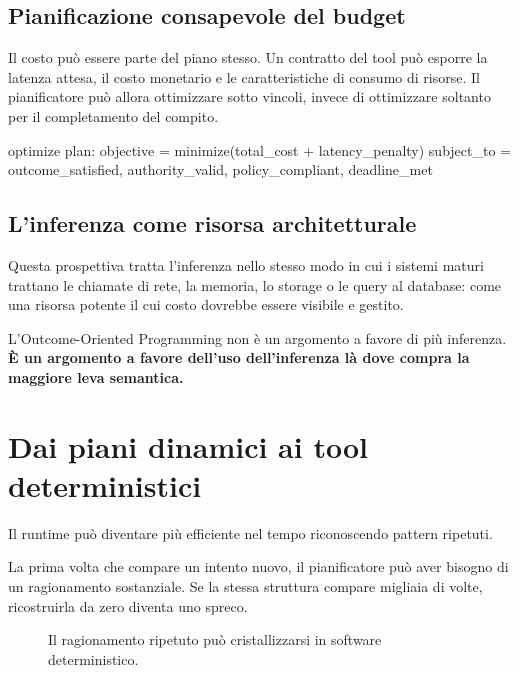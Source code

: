 \documentclass[10pt,oneside,openany]{book}
\begin{document}
\section{Pianificazione consapevole del budget}
Il costo può essere parte del piano stesso. Un contratto del tool può esporre la latenza attesa, il costo monetario e le caratteristiche di consumo di risorse. Il pianificatore può allora ottimizzare sotto vincoli, invece di ottimizzare soltanto per il completamento del compito.

\begin{codeblock}
optimize plan:
  objective = minimize(total_cost + latency_penalty)
  subject_to = {
    outcome_satisfied,
    authority_valid,
    policy_compliant,
    deadline_met
  }
\end{codeblock}

\section{L'inferenza come risorsa architetturale}
Questa prospettiva tratta l'inferenza nello stesso modo in cui i sistemi maturi trattano le chiamate di rete, la memoria, lo storage o le query al database: come una risorsa potente il cui costo dovrebbe essere visibile e gestito.

L'Outcome-Oriented Programming non è un argomento a favore di più inferenza. \textbf{È un argomento a favore dell'uso dell'inferenza là dove compra la maggiore leva semantica.}

\chapter{Dai piani dinamici ai tool deterministici}

Il runtime può diventare più efficiente nel tempo riconoscendo pattern ripetuti.

La prima volta che compare un intento nuovo, il pianificatore può aver bisogno di un ragionamento sostanziale. Se la stessa struttura compare migliaia di volte, ricostruirla da zero diventa uno spreco.

\begin{figure}[ht]
\centering
{}
\caption{Il ragionamento ripetuto può cristallizzarsi in software deterministico.}
\end{figure}
\end{document}
